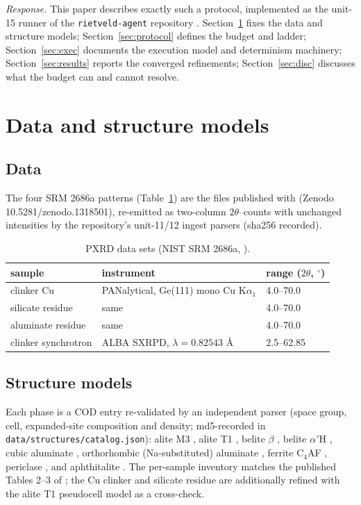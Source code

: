 \documentclass[11pt,a4paper]{article}
\begin{document}
\emph{Response.} This paper describes exactly such a protocol, implemented
as the unit-15 runner of the \texttt{rietveld-agent} repository
\cite{rietveld-agent}. Section~\ref{sec:data} fixes the data and structure
models; Section~\ref{sec:protocol} defines the budget and ladder;
Section~\ref{sec:exec} documents the execution model and determinism
machinery; Section~\ref{sec:results} reports the converged refinements;
Section~\ref{sec:disc} discusses what the budget can and cannot resolve.

\section{Data and structure models}\label{sec:data}
\subsection{Data}
The four SRM 2686a patterns (Table~\ref{tab:data}) are the files
published with \cite{garcia-mate2024srms} (Zenodo
10.5281/zenodo.1318501), re-emitted as two-column $2\theta$--counts with
unchanged intensities by the repository's unit-11/12 ingest parsers
(sha256 recorded).
\begin{table}[ht]
\centering
\small
\begin{tabular}{@{}lll@{}}
\toprule
sample & instrument & range ($2\theta$, $^\circ$) \\
\midrule
clinker Cu & PANalytical, Ge(111) mono Cu K$\alpha_1$ & 4.0--70.0 \\
silicate residue & same & 4.0--70.0 \\
aluminate residue & same & 4.0--70.0 \\
clinker synchrotron & ALBA SXRPD, $\lambda = 0.82543$ \AA & 2.5--62.85 \\
\bottomrule
\end{tabular}
\caption{PXRD data sets (NIST SRM 2686a, \cite{garcia-mate2024srms}).}
\label{tab:data}
\end{table}

\subsection{Structure models}
Each phase is a COD entry re-validated by an independent parser (space
group, cell, expanded-site composition and density; md5-recorded in
\texttt{data/structures/catalog.json}):
alite M3 \cite{nishi1985alite}, alite T1 \cite{delatorre2002t1},
belite $\beta$ \cite{tsurumi1994belite}, belite $\alpha'$H
\cite{mumme1996alphah}, cubic aluminate \cite{mondal1975c3a},
orthorhombic (Na-substituted) aluminate \cite{takeuchi1980c3ana},
ferrite C$_4$AF \cite{colville1972c4af}, periclase
\cite{sasaki1979periclase}, and aphthitalite \cite{okada1980aphthitalite}.
The per-sample inventory matches the published Tables 2--3 of
\cite{garcia-mate2024srms}; the Cu clinker and silicate residue are
additionally refined with the alite T1 pseudocell model as a
cross-check.
\end{document}
